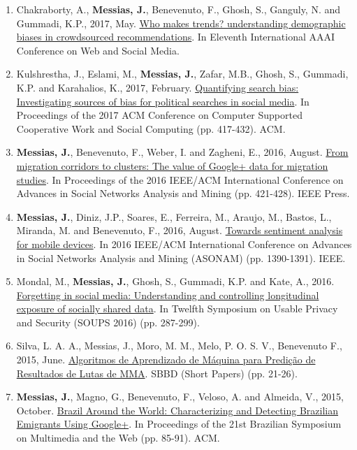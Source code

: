 \begin{enumerate}
    \item Chakraborty, A., \textbf{Messias, J.}, Benevenuto, F., Ghosh, S., Ganguly, N. and Gummadi, K.P., 2017, May. \href{https://people.mpi-sws.org/~johnme/pdf/chakraborty_icwsm17_who_makes_trends.pdf}{Who makes trends? understanding demographic biases in crowdsourced recommendations}. In Eleventh International AAAI Conference on Web and Social Media.
    \item Kulshrestha, J., Eslami, M., \textbf{Messias, J.}, Zafar, M.B., Ghosh, S., Gummadi, K.P. and Karahalios, K., 2017, February. \href{https://people.mpi-sws.org/~johnme/pdf/kulshrestha_cscw17_search_bias.pdf}{Quantifying search bias: Investigating sources of bias for political searches in social media}. In Proceedings of the 2017 ACM Conference on Computer Supported Cooperative Work and Social Computing (pp. 417-432). ACM.
    \item \textbf{Messias, J.}, Benevenuto, F., Weber, I. and Zagheni, E., 2016, August. \href{https://people.mpi-sws.org/~johnme/pdf/messias_asonam16_migration.pdf}{From migration corridors to clusters: The value of Google+ data for migration studies}. In Proceedings of the 2016 IEEE/ACM International Conference on Advances in Social Networks Analysis and Mining (pp. 421-428). IEEE Press.
    \item \textbf{Messias, J.}, Diniz, J.P., Soares, E., Ferreira, M., Araujo, M., Bastos, L., Miranda, M. and Benevenuto, F., 2016, August. \href{https://people.mpi-sws.org/~johnme/pdf/messias_asonam16_mobile.pdf}{Towards sentiment analysis for mobile devices}. In 2016 IEEE/ACM International Conference on Advances in Social Networks Analysis and Mining (ASONAM) (pp. 1390-1391). IEEE.
    \item Mondal, M., \textbf{Messias, J.}, Ghosh, S., Gummadi, K.P. and Kate, A., 2016. \href{https://people.mpi-sws.org/~johnme/pdf/mainack_soups16.pdf}{Forgetting in social media: Understanding and controlling longitudinal exposure of socially shared data}. In Twelfth Symposium on Usable Privacy and Security ({SOUPS} 2016) (pp. 287-299).
    \item Silva, L. A. A., Messias, J., Moro, M. M., Melo, P. O. S. V., Benevenuto F., 2015, June. \href{https://people.mpi-sws.org/~johnme/pdf/leandro_sbbd15.pdf}{Algoritmos de Aprendizado de Máquina para Predição de Resultados de Lutas de MMA}. SBBD (Short Papers) (pp. 21-26).
    \item \textbf{Messias, J.}, Magno, G., Benevenuto, F., Veloso, A. and Almeida, V., 2015, October. \href{https://people.mpi-sws.org/~johnme/pdf/messias_webmedia15.pdf}{Brazil Around the World: Characterizing and Detecting Brazilian Emigrants Using Google+}. In Proceedings of the 21st Brazilian Symposium on Multimedia and the Web (pp. 85-91). ACM.

\end{enumerate}
